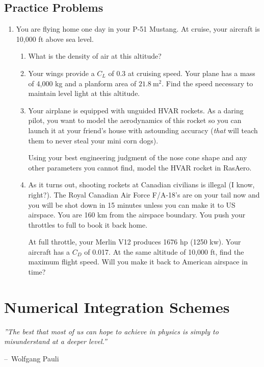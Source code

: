 \documentclass[12pt]{report}
\makeatletter
\newenvironment{chapquote}[2][2em]
  {\setlength{\@tempdima}{#1}%
   \def\chapquote@author{#2}%
   \parshape 1 \@tempdima \dimexpr\textwidth-2\@tempdima\relax%
   \itshape}
  {\par\normalfont\hfill--\ \chapquote@author\hspace*{\@tempdima}\par\bigskip}
\makeatother
\begin{document}
\section{Practice Problems}
\begin{enumerate}
    \item You are flying home one day in your P-51 Mustang. At cruise, your aircraft is 10,000 ft above sea level.
\begin{enumerate}
    \item What is the density of air at this altitude?
    \item Your wings provide a $C_L$ of 0.3 at cruising speed. Your plane has a mass of 4,000 kg and a planform area of $21.8 \mathrm{\ m}^2$. Find the speed necessary to maintain level light at this altitude.
    \item Your airplane is equipped with  unguided HVAR rockets. As a daring pilot, you want to model the aerodynamics of this rocket so you can launch it at your friend's house with astounding accuracy (\textit{that} will teach them to never steal your mini corn dogs).
    
    Using your best engineering judgment of the nose cone shape and any other parameters you cannot find, model the HVAR rocket in RasAero.
    \item As it turns out, shooting rockets at Canadian civilians is illegal (I know, right?). The Royal Canadian Air Force F/A-18's are on your tail now and you will be shot down in 15 minutes unless you can make it to US airspace. You are 160 km from the airspace boundary. You push your throttles to full to book it back home. 

    At full throttle, your Merlin V12 produces 1676 hp (1250 kw). Your aircraft has a $C_D$ of 0.017. At the same altitude of 10,000 ft, find the maximum flight speed. Will you make it back to American airspace in time?

\end{enumerate}
\end{enumerate}
\chapter{Numerical Integration Schemes}\label{sec:numerical integration schemes}

\begin{chapquote}{Wolfgang Pauli}
    ''The best that most of us can hope to achieve in physics is simply to misunderstand at a deeper level.''
\end{chapquote}
\end{document}
